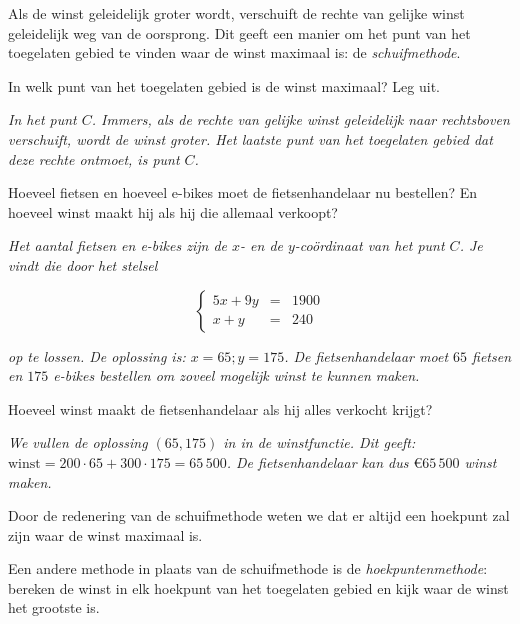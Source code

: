     Als de winst geleidelijk groter wordt, verschuift de rechte van gelijke winst geleidelijk weg van de oorsprong. Dit geeft een manier om het punt van het toegelaten gebied te vinden waar de winst maximaal is: de \emph{schuifmethode}.
    
    \begin{werktekstoef}
    
    \setcounter{enumi}{9}
    
    \item In welk punt van het toegelaten gebied is de winst maximaal? Leg uit.
	
	\emph{In het punt $C$. Immers, als de rechte van gelijke winst geleidelijk naar rechtsboven verschuift, wordt de winst groter. Het laatste punt van het toegelaten gebied dat deze rechte ontmoet, is punt $C$.}
	
	\item Hoeveel fietsen en hoeveel e-bikes moet de fietsenhandelaar nu bestellen? En hoeveel winst maakt hij als hij die allemaal verkoopt?
	
	\emph{Het aantal fietsen en e-bikes zijn de $x$- en de $y$-coördinaat van het punt $C$. Je vindt die door het stelsel}
	
    $$
    \left\{
    \begin{array}{ccl}
    	
    	5x+9y &= &1900 \\
    	x+y &= &240
    	
    \end{array}
    \right.
    $$
    
	\emph{op te lossen. De oplossing is: $x=65; y=175$. De fietsenhandelaar moet $65$ fietsen en $175$ e-bikes bestellen om zoveel mogelijk winst te kunnen maken.}
	
	\item Hoeveel winst maakt de fietsenhandelaar als hij alles verkocht krijgt?
	
	\emph{We vullen de oplossing $(65, 175)$ in in de winstfunctie. Dit geeft: $\mathrm{winst}= 200\cdot 65+300\cdot 175=65\,500 $. De fietsenhandelaar kan dus $\euro 65\,500$ winst maken.}
	
	\end{werktekstoef}
	
    Door de redenering van de schuifmethode weten we dat er altijd een hoekpunt zal zijn waar de winst maximaal is. 
    
    Een andere methode in plaats van de schuifmethode is de \emph{hoekpuntenmethode}: bereken de winst in elk hoekpunt van het toegelaten gebied en kijk waar de winst het grootste is.
	
